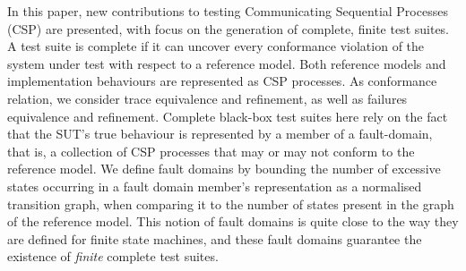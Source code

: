 In this paper, new contributions to testing Communicating Sequential
Processes (CSP) are presented, with focus on the generation of complete,
finite test suites. A test suite is complete if it can uncover every
conformance violation of the system under test with respect to a reference
model. Both reference models and implementation behaviours are represented as
CSP processes. As conformance relation, we consider trace equivalence and
refinement, as well as failures equivalence and refinement.
Complete black-box test suites here rely on the fact that the SUT's true
behaviour is represented by a member of a fault-domain, that is, a collection
of CSP processes that may or may not conform to the reference model. We
define fault domains by bounding the number of excessive states occurring in
a fault domain member's representation as a normalised transition graph, when
comparing it to the number of states present in the graph of the reference
model. This notion of fault domains is quite close to the way they are
defined for finite state machines, and these fault domains guarantee the
existence of {\it finite} complete test suites.
